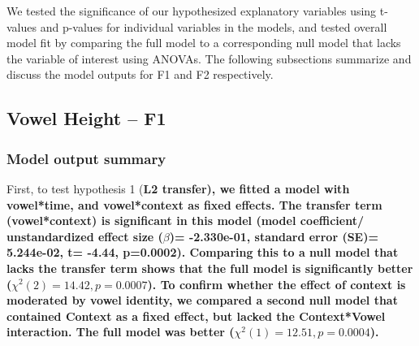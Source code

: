 \documentclass[12 pt]{article}
\begin{document}
We tested the significance of our hypothesized explanatory variables using t-values and p-values for individual variables in the models, and tested overall model fit by comparing the full model to a corresponding null model that lacks the variable of interest using ANOVAs. The following subsections summarize and discuss the model outputs for F1 and F2 respectively.



\subsection{Vowel Height -- F1}

\subsubsection*{Model output summary}

First, to test hypothesis 1 (\bf{L2 transfer}), we fitted a model with vowel*time, and vowel*context as fixed effects. The transfer term (vowel*context) is significant in this model (model coefficient/ unstandardized effect size ($\beta$)= -2.330e-01, standard error (SE)=  5.244e-02, t= -4.44, p=0.0002). Comparing this to a null model that lacks the transfer term shows that the full model is significantly better ($\chi^2(2) = 14.42, p=  0.0007$). To confirm whether the effect of context is moderated by vowel identity, we compared a second null model that contained Context as a fixed effect, but lacked the Context*Vowel interaction. The full model was better ($\chi^2(1) = 12.51, p= 0.0004$).
\end{document}
